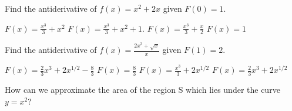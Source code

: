 \documentclass[addpoints, 12pt]{exam}%
\newcommand{\spc}{\vspace*{0.5cm}}
\begin{document}
\begin{questions}
\spc

\question[1]

Find the antiderivative of $f(x) = x^2 + 2x$ given $F(0) = 1$.

\begin{multicols}{2}
\begin{choices}
\choice $F(x) = \frac{x^3}{3} + x^2$
\CorrectChoice $F(x) = \frac{x^3}{3} + x^2 +1$.
\choice $F(x) = \frac{x^3}{3} + \frac{x}{2}$
\choice $F(x) = 1$
\end{choices}
\end{multicols}

\spc

\question[1]

Find the antiderivative of $f(x) = \frac{2x^3 + \sqrt{x}}{x}$ given $F(1) = 2$.

\begin{multicols}{2}
\begin{choices}
\CorrectChoice $F(x) = \frac{2}{3}x^3 + 2x^{1/2} - \frac{8}{3}$
\choice $F(x) = \frac{8}{3}$
\choice $F(x) = \frac{x^3}{3} + 2x^{1/2}$
\choice $F(x) = \frac{2}{3}x^3 + 2x^{1/2}$
\end{choices}
\end{multicols}

\spc

\question[1]

How can we approximate the area of the region S which lies under the curve $y = x^2$?


\end{questions}
\end{document}
